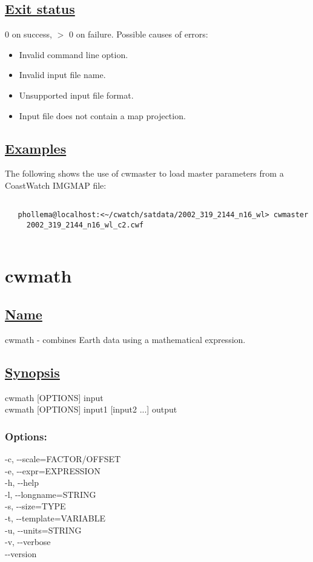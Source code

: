 \subsection*{\underline{Exit status}}


  0 on success, $>$ 0 on failure. Possible causes of errors: \begin{itemize}
\item  Invalid command line option. 
\item  Invalid input file name. 
\item  Unsupported input file format. 
\item  Input file does not contain a map projection. 

\end{itemize}

\subsection*{\underline{Examples}}


  The following shows the use of cwmaster to load master parameters from a CoastWatch IMGMAP file: \begin{verbatim}

   phollema@localhost:<~/cwatch/satdata/2002_319_2144_n16_wl> cwmaster 
     2002_319_2144_n16_wl_c2.cwf
 
\end{verbatim}


\newpage
\section{cwmath} \hypertarget{cwmath}{}
\subsection*{\underline{Name}}


   cwmath - combines Earth data using a mathematical expression.  
\subsection*{\underline{Synopsis}}


  cwmath [OPTIONS] input \\ 
 cwmath [OPTIONS] input1 [input2 ...] output 
\subsubsection*{Options:}


  -c, -{-}scale=FACTOR/OFFSET \\ 
 -e, -{-}expr=EXPRESSION \\ 
 -h, -{-}help \\ 
 -l, -{-}longname=STRING \\ 
 -s, -{-}size=TYPE \\ 
 -t, -{-}template=VARIABLE \\ 
 -u, -{-}units=STRING \\ 
 -v, -{-}verbose \\ 
 -{-}version \\ 

